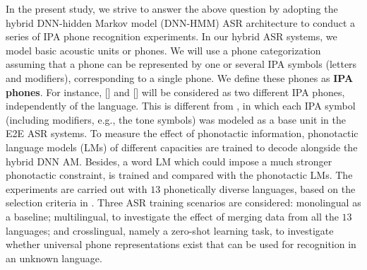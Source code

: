 \documentclass{article}
\begin{document}
In the present study, we strive to answer the above question by adopting the hybrid DNN-hidden Markov model (DNN-HMM) ASR architecture to conduct a series of IPA phone recognition experiments. 
In our hybrid ASR systems, we model basic acoustic units or phones. We will use a phone categorization assuming that a phone can be represented by one or several IPA symbols (letters and modifiers), corresponding to a single phone. We define these phones as \textbf{IPA phones}. For instance, [] and [\textlengthmark{}] will be considered as two different IPA phones, independently of the language. This is different from \cite{Zelasko2020That}, in which each IPA symbol (including modifiers, e.g., the tone symbols) was modeled as a base unit in the E2E ASR systems.
To measure the effect of phonotactic information, phonotactic language models (LMs) of different capacities are trained to decode alongside the hybrid DNN AM. Besides, a word LM which could impose a much stronger phonotactic constraint, is trained and compared with the phonotactic LMs. 
The experiments are carried out with $13$ phonetically diverse languages, based on the selection criteria in \cite{Zelasko2020That}.  
Three ASR training scenarios are considered: monolingual as a baseline; multilingual, to investigate the effect of merging data from all the $13$ languages; and crosslingual, namely a zero-shot learning task,
to investigate whether universal phone representations exist that can be used for recognition in an unknown language. 



\end{document}
